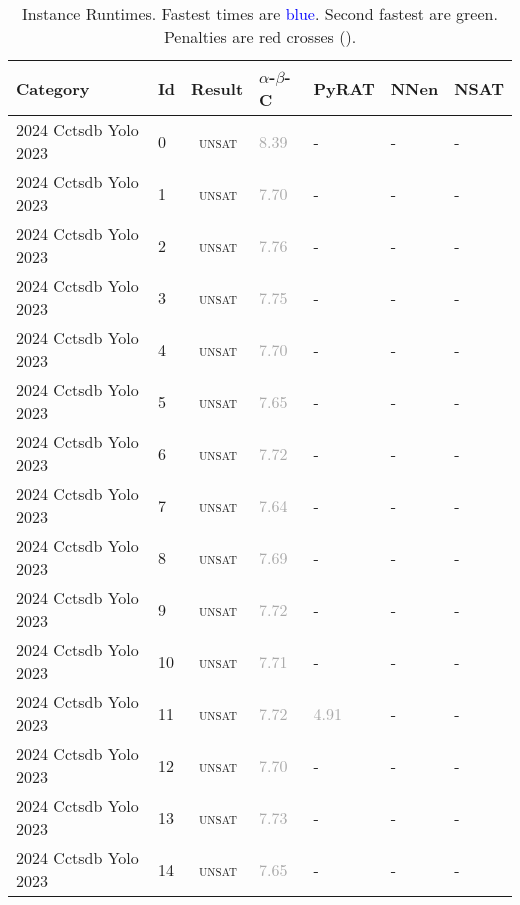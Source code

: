 

\begin{center}
{\setlength{\tabcolsep}{1pt}
\scriptsize
\begin{longtable}{@{}lllllll@{}}
\caption{\footnotesize Instance Runtimes. Fastest times are \textcolor{blue}{blue}. Second fastest are \textcolor{second}{green}. Penalties are red crosses (\textbf{\textcolor{red}{}}).} \label{tab:all_results} \\
\toprule
\textbf{Category} & \textbf{Id} & \textbf{Result} & \textbf{$\alpha$-$\beta$-C} & \textbf{PyRAT} & \textbf{NNen} & \textbf{NSAT} \\
\midrule
\endhead
2024 Cctsdb Yolo 2023 & 0 & ~\textsc{unsat} & \textcolor{darkgray}{8.39} & - & - & - \\
2024 Cctsdb Yolo 2023 & 1 & ~\textsc{unsat} & \textcolor{darkgray}{7.70} & - & - & - \\
2024 Cctsdb Yolo 2023 & 2 & ~\textsc{unsat} & \textcolor{darkgray}{7.76} & - & - & - \\
2024 Cctsdb Yolo 2023 & 3 & ~\textsc{unsat} & \textcolor{darkgray}{7.75} & - & - & - \\
2024 Cctsdb Yolo 2023 & 4 & ~\textsc{unsat} & \textcolor{darkgray}{7.70} & - & - & - \\
2024 Cctsdb Yolo 2023 & 5 & ~\textsc{unsat} & \textcolor{darkgray}{7.65} & - & - & - \\
2024 Cctsdb Yolo 2023 & 6 & ~\textsc{unsat} & \textcolor{darkgray}{7.72} & - & - & - \\
2024 Cctsdb Yolo 2023 & 7 & ~\textsc{unsat} & \textcolor{darkgray}{7.64} & - & - & - \\
2024 Cctsdb Yolo 2023 & 8 & ~\textsc{unsat} & \textcolor{darkgray}{7.69} & - & - & - \\
2024 Cctsdb Yolo 2023 & 9 & ~\textsc{unsat} & \textcolor{darkgray}{7.72} & - & - & - \\
2024 Cctsdb Yolo 2023 & 10 & ~\textsc{unsat} & \textcolor{darkgray}{7.71} & - & - & - \\
2024 Cctsdb Yolo 2023 & 11 & ~\textsc{unsat} & \textcolor{darkgray}{7.72} & \textcolor{darkgray}{4.91} & - & - \\
2024 Cctsdb Yolo 2023 & 12 & ~\textsc{unsat} & \textcolor{darkgray}{7.70} & - & - & - \\
2024 Cctsdb Yolo 2023 & 13 & ~\textsc{unsat} & \textcolor{darkgray}{7.73} & - & - & - \\
2024 Cctsdb Yolo 2023 & 14 & ~\textsc{unsat} & \textcolor{darkgray}{7.65} & - & - & - \\

\end{longtable}}
\end{center}
